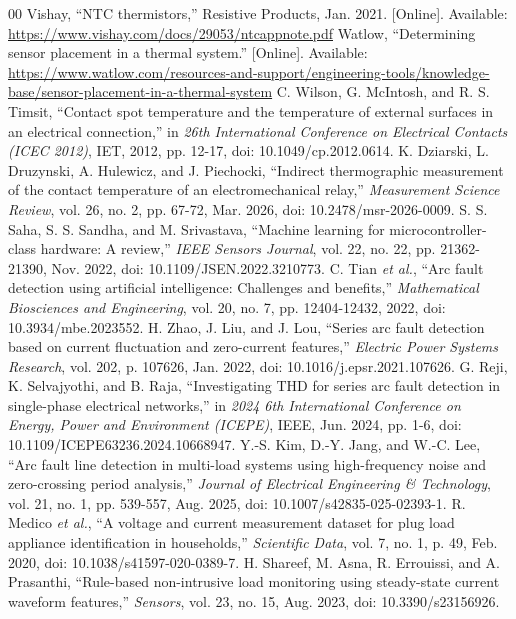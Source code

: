\documentclass[conference,a4paper]{template/IEEEtran}
\begin{document}
\begin{thebibliography}{00}
 Vishay, ``NTC thermistors,'' Resistive Products, Jan. 2021. [Online]. Available: \url{https://www.vishay.com/docs/29053/ntcappnote.pdf}
 Watlow, ``Determining sensor placement in a thermal system.'' [Online]. Available: \url{https://www.watlow.com/resources-and-support/engineering-tools/knowledge-base/sensor-placement-in-a-thermal-system}
 C. Wilson, G. McIntosh, and R. S. Timsit, ``Contact spot temperature and the temperature of external surfaces in an electrical connection,'' in \textit{26th International Conference on Electrical Contacts (ICEC 2012)}, IET, 2012, pp. 12-17, doi: 10.1049/cp.2012.0614.
 K. Dziarski, L. Druzynski, A. Hulewicz, and J. Piechocki, ``Indirect thermographic measurement of the contact temperature of an electromechanical relay,'' \textit{Measurement Science Review}, vol. 26, no. 2, pp. 67-72, Mar. 2026, doi: 10.2478/msr-2026-0009.
 S. S. Saha, S. S. Sandha, and M. Srivastava, ``Machine learning for microcontroller-class hardware: A review,'' \textit{IEEE Sensors Journal}, vol. 22, no. 22, pp. 21362-21390, Nov. 2022, doi: 10.1109/JSEN.2022.3210773.
 C. Tian \textit{et al.}, ``Arc fault detection using artificial intelligence: Challenges and benefits,'' \textit{Mathematical Biosciences and Engineering}, vol. 20, no. 7, pp. 12404-12432, 2022, doi: 10.3934/mbe.2023552.
 H. Zhao, J. Liu, and J. Lou, ``Series arc fault detection based on current fluctuation and zero-current features,'' \textit{Electric Power Systems Research}, vol. 202, p. 107626, Jan. 2022, doi: 10.1016/j.epsr.2021.107626.
 G. Reji, K. Selvajyothi, and B. Raja, ``Investigating THD for series arc fault detection in single-phase electrical networks,'' in \textit{2024 6th International Conference on Energy, Power and Environment (ICEPE)}, IEEE, Jun. 2024, pp. 1-6, doi: 10.1109/ICEPE63236.2024.10668947.
 Y.-S. Kim, D.-Y. Jang, and W.-C. Lee, ``Arc fault line detection in multi-load systems using high-frequency noise and zero-crossing period analysis,'' \textit{Journal of Electrical Engineering \& Technology}, vol. 21, no. 1, pp. 539-557, Aug. 2025, doi: 10.1007/s42835-025-02393-1.
 R. Medico \textit{et al.}, ``A voltage and current measurement dataset for plug load appliance identification in households,'' \textit{Scientific Data}, vol. 7, no. 1, p. 49, Feb. 2020, doi: 10.1038/s41597-020-0389-7.
 H. Shareef, M. Asna, R. Errouissi, and A. Prasanthi, ``Rule-based non-intrusive load monitoring using steady-state current waveform features,'' \textit{Sensors}, vol. 23, no. 15, Aug. 2023, doi: 10.3390/s23156926.

\end{thebibliography}
\end{document}
